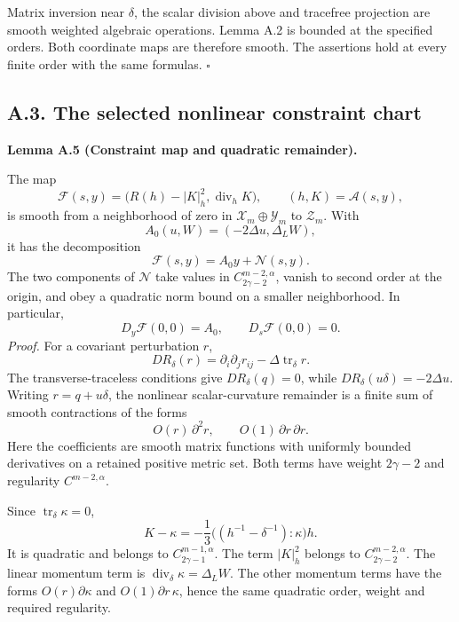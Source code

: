 \documentclass[
  english,
  11pt,
  reqno]{amsart}
\makeatletter
\newcommand{\paperdisplaynext}{%
  \let\paper@savedstartsection\@startsection
  \def\@startsection##1##2##3##4##5##6{%
    \let\@startsection\paper@savedstartsection
    \@tempskipa ##5\relax
    \ifdim\@tempskipa<\z@
      \def\paper@afterskip{.35\baselineskip}%
    \else
      \def\paper@afterskip{##5}%
    \fi
    \@startsection{##1}{##2}{##3}{##4}{\paper@afterskip}{##6}}}
\newcommand{\paperdisplaysection}{\paperdisplaynext\subsection}
\newcommand{\pandocstatementheading}[1]{%
  \par\if@nobreak\else
    \addpenalty{\@beginparpenalty}%
    \addvspace{.5\baselineskip plus .2\baselineskip minus .2\baselineskip}%
  \fi
  {\normalfont\bfseries #1\par}%
  \nobreak\@afterindenttrue\@afterheading
}
\let\paper@displaysection\paperdisplaysection
\renewcommand{\paperdisplaysection}[1]{%
  \let\paper@savedhangfrom\@hangfrom
  \long\def\@hangfrom##1##2{%
    \paper@savedhangfrom{##1}{\paper@headingparagraph##2}}%
  \paper@displaysection{#1}%
  \let\@hangfrom\paper@savedhangfrom}
\makeatother
\begin{document}
Matrix inversion near \(\delta\), the scalar division above and
tracefree projection are smooth weighted algebraic operations. Lemma A.2
is bounded at the specified orders. Both coordinate maps are therefore
smooth. The assertions hold at every finite order with the same
formulas. \hfill\(\square\)

\paperdisplaysection{A.3. The selected nonlinear constraint
chart}\label{a.3.-the-selected-nonlinear-constraint-chart}\label{sec:online-chart-constraint-solution}

\pandocstatementheading{\leavevmode{}\label{lem:online-chart-constraint-remainder}Lemma A.5 (Constraint map and quadratic remainder).}

The map \[
\mathcal F(s,y)
=\bigl(R(h)-|K|_h^2,\operatorname{div}_hK\bigr),
\qquad (h,K)=\mathcal A(s,y),
\] is smooth from a neighborhood of zero in
\(\mathcal X_m\oplus\mathcal Y_m\) to \(\mathcal Z_m\). With%
 \[
A_0(u,W)=(-2\Delta u,\Delta_LW),
\] it has the decomposition%
 \[
\mathcal F(s,y)=A_0y+\mathcal N(s,y).
\] The two components of \(\mathcal N\) take values in
\(C^{m-2,\alpha}_{2\gamma-2}\), vanish to second order at the origin,
and obey a quadratic norm bound on a smaller neighborhood. In
particular, \[
D_y\mathcal F(0,0)=A_0,\qquad
D_s\mathcal F(0,0)=0.
\] \emph{Proof.} For a covariant perturbation \(r\), \[
DR_\delta(r)
=\partial_i\partial_jr_{ij}
-\Delta\operatorname{tr}_\delta r.
\] The transverse-traceless conditions give \(DR_\delta(q)=0\), while
\(DR_\delta(u\delta)=-2\Delta u\). Writing \(r=q+u\delta\), the
nonlinear scalar-curvature remainder is a finite sum of smooth
contractions of the forms \[
O(r)\,\partial^2r,\qquad
O(1)\,\partial r\,\partial r.
\] Here the coefficients are smooth matrix functions with uniformly
bounded derivatives on a retained positive metric set. Both terms have
weight \(2\gamma-2\) and regularity \(C^{m-2,\alpha}\).

Since \(\operatorname{tr}_\delta\kappa=0\), \[
K-\kappa
=-\frac13\bigl((h^{-1}-\delta^{-1}):\kappa\bigr)h.
\] It is quadratic and belongs to \(C^{m-1,\alpha}_{2\gamma-1}\). The
term \(|K|_h^2\) belongs to \(C^{m-2,\alpha}_{2\gamma-2}\). The linear
momentum term is \(\operatorname{div}_\delta\kappa=\Delta_LW\). The
other momentum terms have the forms \(O(r)\partial\kappa\) and
\(O(1)\partial r\,\kappa\), hence the same quadratic order, weight and
required regularity.
\end{document}
